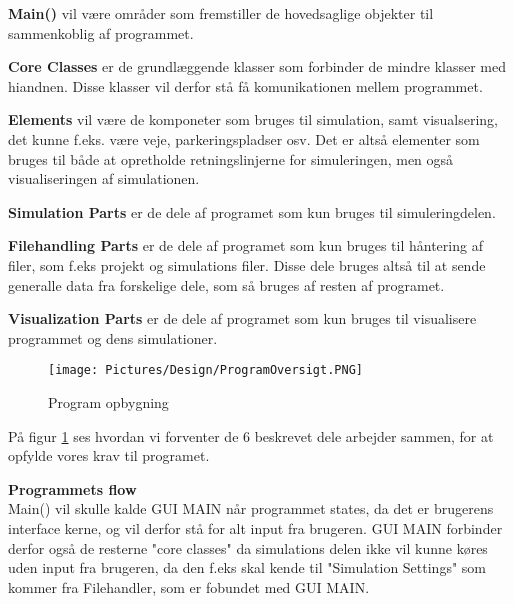 \textbf{Main()} vil være områder som fremstiller de hovedsaglige objekter til sammenkoblig af programmet.

\vspace{5mm}

\textbf{Core Classes} er de grundlæggende klasser som forbinder de mindre klasser med hiandnen. Disse klasser vil derfor stå få komunikationen mellem programmet.

\vspace{5mm}

\textbf{Elements} vil være de komponeter som bruges til simulation, samt visualsering, det kunne f.eks. være veje, parkeringspladser osv. Det er altså elementer som bruges til både at opretholde retningslinjerne for simuleringen, men også visualiseringen af simulationen.

\vspace{5mm}

\textbf{Simulation Parts} er de dele af programet som kun bruges til simuleringdelen.

\vspace{5mm}

\textbf{Filehandling Parts} er de dele af programet som kun bruges til håntering af filer, som f.eks projekt og simulations filer. Disse dele bruges altså til at sende generalle data fra forskelige dele, som så bruges af resten af programet.  

\vspace{5mm}

\textbf{Visualization Parts} er de dele af programet som kun bruges til visualisere programmet og dens simulationer.

\begin{figure}[H]
\begin{adjustbox}{width=1.0\textwidth,center=\textwidth}
\centering
\texttt{[image: Pictures/Design/ProgramOversigt.PNG]}
\end{adjustbox}
\caption{Program opbygning}
\label{fig:ProgramOversigt}
\end{figure}

\vspace{5mm}

På figur \ref{fig:ProgramOversigt} ses hvordan vi forventer de 6 beskrevet dele arbejder sammen, for at opfylde vores krav til programet.

\vspace{5mm}

\textbf{Programmets flow} \\
Main() vil skulle kalde GUI MAIN når programmet states, da det er brugerens interface kerne, og vil derfor stå for alt input fra brugeren. GUI MAIN forbinder derfor også de resterne "core classes" da simulations delen ikke vil kunne køres uden input fra brugeren, da den f.eks skal kende til "Simulation Settings" som kommer fra Filehandler, som er fobundet med GUI MAIN. \\

